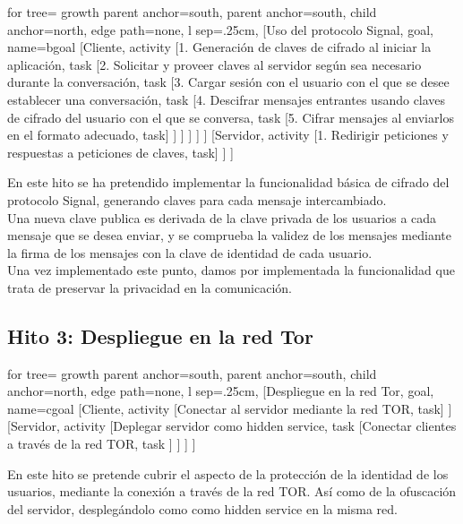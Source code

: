 \begin{adjustbox}{margin=2.5ex 5ex 2.5ex 2.5ex,center}
	\begin{forest} for tree={
			growth parent anchor=south,
			parent anchor=south,
			child anchor=north,
			edge path={none}, 
			l sep=.25cm,
	}   
	[Uso del protocolo Signal, goal, name=bgoal
		[Cliente, activity
		[1. Generación de claves de cifrado al iniciar la aplicación, task
		[2. Solicitar y proveer claves al servidor según sea necesario durante la conversación, task
		[3. Cargar sesión con el usuario con el que se desee establecer una conversación, task
		[4. Descifrar mensajes entrantes usando claves de cifrado del usuario con el que se conversa, task
		[5. Cifrar mensajes al enviarlos\, en el formato adecuado, task] ] ] ] ] ]
		[Servidor, activity
		[1. Redirigir peticiones y respuestas a peticiones de claves, task] ] ] 
	\end{forest}
\end{adjustbox}

En este hito se ha pretendido implementar la funcionalidad básica de cifrado del protocolo Signal, generando claves para cada mensaje intercambiado. \\
Una nueva clave publica es derivada de la clave privada de los usuarios a cada mensaje que se desea enviar, y se comprueba la validez de los mensajes mediante la firma de los mensajes con la clave de identidad de cada usuario. \\ 
Una vez implementado este punto, damos por implementada la funcionalidad que trata de preservar la privacidad en la comunicación. \\ 

\subsection{Hito 3: Despliegue en la red Tor}
\begin{adjustbox}{margin=2.5ex 5ex 2.5ex 2.5ex,center}
	\begin{forest} for tree={
			growth parent anchor=south,
			parent anchor=south,
			child anchor=north,
			edge path={none}, 
			l sep=.25cm,
	}   
	[Despliegue en la red Tor, goal, name=cgoal
		[Cliente, activity
		[Conectar al servidor mediante la red TOR, task] ]
		[Servidor, activity
		[Deplegar servidor como hidden service, task
		[Conectar clientes a través de la red TOR, task ] ] ] ] 
	\end{forest}
\end{adjustbox}

En este hito se pretende cubrir el aspecto de la protección de la identidad de los usuarios, mediante la conexión a través de la red TOR. Así como de la ofuscación del servidor, desplegándolo como como hidden service en la misma red. \\